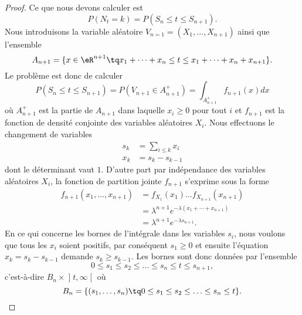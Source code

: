 \begin{proof}
	Ce que nous devons calculer est
	\begin{equation}
		P(N_t=k)=P(S_{n}\leq t\leq S_{n+1}).
	\end{equation}
	Nous introduisons la variable aléatoire \( V_{n=1}=(X_1,\ldots,X_{n+1})\) ainsi que l'ensemble
	\begin{equation}
		A_{n+1}=\{ x\in\eR^{n+1}\tq x_1+\cdots+x_n\leq t\leq x_1+\cdots+x_n+x_{n+1} \}.
	\end{equation}
	Le problème est donc de calculer
	\begin{equation}
		P(S_n\leq t\leq S_{n+1})=P(V_{n+1}\in A_{n+1}^+)=\int_{A_{n+1}^+}f_{n+1}(x)dx
	\end{equation}
	où \( A_{n+1}^+\) est la partie de \( A_{n+1}\) dans laquelle \( x_i\geq 0\) pour tout \( i\) et \( f_{n+1}\) est la fonction de densité conjointe des variables aléatoires \( X_i\). Nous effectuons le changement de variables
	\begin{subequations}
		\begin{align}
			s_k & =\sum_{i\leq k}x_i \\
			x_k & =s_k-s_{k-1}
		\end{align}
	\end{subequations}
	dont le déterminant vaut \( 1\). D'autre part par indépendance des variables aléatoires \( X_i\), la fonction de partition jointe \( f_{n+1}\) s'exprime sous la forme
	\begin{subequations}
		\begin{align}
			f_{n+1}(x_1,\ldots,x_{n+1}) & =f_{X_1}(x_1)\ldots f_{X_{n+1}}(x_{n+1})        \\
			                            & =\lambda^{n+1} e^{-\lambda(x_1+\cdots+x_{n+1})} \\
			                            & =\lambda^{n+1} e^{-\lambda s_{n+1}}.
		\end{align}
	\end{subequations}
	En ce qui concerne les bornes de l'intégrale dans les variables \( s_i\), nous voulons que tous les \( x_i\) soient positifs, par conséquent \( s_1\geq 0\) et ensuite l'équation \( x_k=s_k-s_{k-1}\) demande \( s_k\geq s_{k-1}\). Les bornes sont donc données par l'ensemble
	\begin{equation}
		0\leq s_1\leq s_2\leq\ldots\leq s_n\leq t\leq s_{n+1},
	\end{equation}
	c'est-à-dire \( B_n\times \mathopen] t , \infty \mathclose[\) où
	\begin{equation}
		B_n=\{ (s_1,\ldots,s_n)\tq 0\leq s_1\leq s_2\leq\ldots\leq s_n\leq t \}.

\end{equation}
\end{proof}
